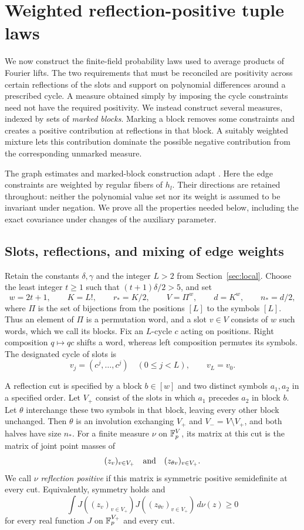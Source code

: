\section{Weighted reflection-positive tuple laws}
\label{sec:tuples}

We now construct the finite-field probability laws used to average products
of Fourier lifts.  The two requirements that must be reconciled are
positivity across certain reflections of the slots and support on
polynomial differences around a prescribed cycle.  A measure obtained
simply by imposing the cycle constraints need not have the required
positivity.  We instead construct several measures, indexed by sets of
\emph{marked blocks}.  Marking a block removes some constraints and creates
a positive contribution at reflections in that block.  A suitably weighted
mixture lets this contribution dominate the possible negative contribution
from the corresponding unmarked measure.

The graph estimates and marked-block construction adapt
\cite[Lemmas~2.1--2.2 and Section~3]{squarepower}.  Here the edge constraints
are weighted by regular fibers of $h_l$.  Their directions are retained
throughout: neither the polynomial value set nor its weight is assumed to
be invariant under negation.  We prove all the properties needed below,
including the exact covariance under changes of the auxiliary parameter.

\subsection{Slots, reflections, and mixing of edge weights}

Retain the constants $\delta,\gamma$ and the integer $L>2$ from
Section~\ref{sec:local}.  Choose the least integer $t\ge1$ such that
$(t+1)\delta/2>5$, and set
\[
 w=2t+1,\qquad K=L!,\qquad r_*=K/2,\qquad
 V=\Pi^w,\qquad d=K^w,\qquad n_*=d/2,
\]
where $\Pi$ is the set of bijections from the positions $[L]$ to the
symbols $[L]$.  Thus an element of $\Pi$ is a permutation word, and a slot
$v\in V$ consists of $w$ such words, which we call its blocks.  Fix an
$L$-cycle $c$ acting on positions.  Right composition $q\mapsto qc$
shifts a word, whereas left composition permutes its symbols.  The
designated cycle of slots is
\[
 v_j=(c^j,\ldots,c^j)\quad(0\le j<L),\qquad v_L=v_0.
\]

A reflection cut is specified by a block $b\in[w]$ and two distinct
symbols $a_1,a_2$ in a specified order.  Let $V_+$ consist of the slots
in which $a_1$ precedes $a_2$ in block $b$.  Let $\theta$ interchange
these two symbols in that block, leaving every other block unchanged.
Then $\theta$ is an involution exchanging $V_+$ and
$V_-=V\setminus V_+$, and both halves have size $n_*$.  For a finite
measure $\nu$ on $\mathbb F_p^V$, its matrix at this cut is the matrix of joint
point masses of
\[
 (z_v)_{v\in V_+}
 \quad\hbox{and}\quad
 (z_{\theta v})_{v\in V_+}.
\]
We call $\nu$ \emph{reflection positive} if this matrix is symmetric
positive semidefinite at every cut.  Equivalently, symmetry holds and
\[
 \int J((z_v)_{v\in V_+})
          J((z_{\theta v})_{v\in V_+})\,d\nu(z)\ge0
\]
for every real function $J$ on $\mathbb F_p^{V_+}$ and every cut.

